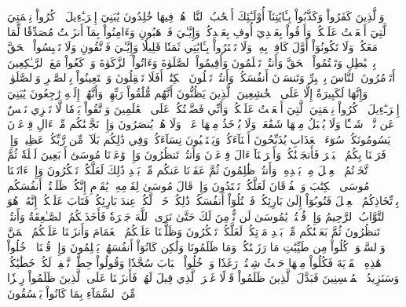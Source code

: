 وَٱلَّذِينَ كَفَرُواْ وَكَذَّبُواْ بِـَٔايَٰتِنَآ أُوْلَـٰٓئِكَ أَصۡحَٰبُ ٱلنَّارِۖ هُمۡ فِيهَا خَٰلِدُونَ
يَٰبَنِيٓ إِسۡرَـٰٓءِيلَ ٱذۡكُرُواْ نِعۡمَتِيَ ٱلَّتِيٓ أَنۡعَمۡتُ عَلَيۡكُمۡ وَأَوۡفُواْ بِعَهۡدِيٓ أُوفِ بِعَهۡدِكُمۡ وَإِيَّـٰيَ فَٱرۡهَبُونِ
وَءَامِنُواْ بِمَآ أَنزَلۡتُ مُصَدِّقٗا لِّمَا مَعَكُمۡ وَلَا تَكُونُوٓاْ أَوَّلَ كَافِرِۭ بِهِۦۖ وَلَا تَشۡتَرُواْ بِـَٔايَٰتِي ثَمَنٗا قَلِيلٗا وَإِيَّـٰيَ فَٱتَّقُونِ
وَلَا تَلۡبِسُواْ ٱلۡحَقَّ بِٱلۡبَٰطِلِ وَتَكۡتُمُواْ ٱلۡحَقَّ وَأَنتُمۡ تَعۡلَمُونَ
وَأَقِيمُواْ ٱلصَّلَوٰةَ وَءَاتُواْ ٱلزَّكَوٰةَ وَٱرۡكَعُواْ مَعَ ٱلرَّـٰكِعِينَ
۞أَتَأۡمُرُونَ ٱلنَّاسَ بِٱلۡبِرِّ وَتَنسَوۡنَ أَنفُسَكُمۡ وَأَنتُمۡ تَتۡلُونَ ٱلۡكِتَٰبَۚ أَفَلَا تَعۡقِلُونَ
وَٱسۡتَعِينُواْ بِٱلصَّبۡرِ وَٱلصَّلَوٰةِۚ وَإِنَّهَا لَكَبِيرَةٌ إِلَّا عَلَى ٱلۡخَٰشِعِينَ
ٱلَّذِينَ يَظُنُّونَ أَنَّهُم مُّلَٰقُواْ رَبِّهِمۡ وَأَنَّهُمۡ إِلَيۡهِ رَٰجِعُونَ
يَٰبَنِيٓ إِسۡرَـٰٓءِيلَ ٱذۡكُرُواْ نِعۡمَتِيَ ٱلَّتِيٓ أَنۡعَمۡتُ عَلَيۡكُمۡ وَأَنِّي فَضَّلۡتُكُمۡ عَلَى ٱلۡعَٰلَمِينَ
وَٱتَّقُواْ يَوۡمٗا لَّا تَجۡزِي نَفۡسٌ عَن نَّفۡسٖ شَيۡـٔٗا وَلَا يُقۡبَلُ مِنۡهَا شَفَٰعَةٞ وَلَا يُؤۡخَذُ مِنۡهَا عَدۡلٞ وَلَا هُمۡ يُنصَرُونَ
وَإِذۡ نَجَّيۡنَٰكُم مِّنۡ ءَالِ فِرۡعَوۡنَ يَسُومُونَكُمۡ سُوٓءَ ٱلۡعَذَابِ يُذَبِّحُونَ أَبۡنَآءَكُمۡ وَيَسۡتَحۡيُونَ نِسَآءَكُمۡۚ وَفِي ذَٰلِكُم بَلَآءٞ مِّن رَّبِّكُمۡ عَظِيمٞ
وَإِذۡ فَرَقۡنَا بِكُمُ ٱلۡبَحۡرَ فَأَنجَيۡنَٰكُمۡ وَأَغۡرَقۡنَآ ءَالَ فِرۡعَوۡنَ وَأَنتُمۡ تَنظُرُونَ
وَإِذۡ وَٰعَدۡنَا مُوسَىٰٓ أَرۡبَعِينَ لَيۡلَةٗ ثُمَّ ٱتَّخَذۡتُمُ ٱلۡعِجۡلَ مِنۢ بَعۡدِهِۦ وَأَنتُمۡ ظَٰلِمُونَ
ثُمَّ عَفَوۡنَا عَنكُم مِّنۢ بَعۡدِ ذَٰلِكَ لَعَلَّكُمۡ تَشۡكُرُونَ
وَإِذۡ ءَاتَيۡنَا مُوسَى ٱلۡكِتَٰبَ وَٱلۡفُرۡقَانَ لَعَلَّكُمۡ تَهۡتَدُونَ
وَإِذۡ قَالَ مُوسَىٰ لِقَوۡمِهِۦ يَٰقَوۡمِ إِنَّكُمۡ ظَلَمۡتُمۡ أَنفُسَكُم بِٱتِّخَاذِكُمُ ٱلۡعِجۡلَ فَتُوبُوٓاْ إِلَىٰ بَارِئِكُمۡ فَٱقۡتُلُوٓاْ أَنفُسَكُمۡ ذَٰلِكُمۡ خَيۡرٞ لَّكُمۡ عِندَ بَارِئِكُمۡ فَتَابَ عَلَيۡكُمۡۚ إِنَّهُۥ هُوَ ٱلتَّوَّابُ ٱلرَّحِيمُ
وَإِذۡ قُلۡتُمۡ يَٰمُوسَىٰ لَن نُّؤۡمِنَ لَكَ حَتَّىٰ نَرَى ٱللَّهَ جَهۡرَةٗ فَأَخَذَتۡكُمُ ٱلصَّـٰعِقَةُ وَأَنتُمۡ تَنظُرُونَ
ثُمَّ بَعَثۡنَٰكُم مِّنۢ بَعۡدِ مَوۡتِكُمۡ لَعَلَّكُمۡ تَشۡكُرُونَ
وَظَلَّلۡنَا عَلَيۡكُمُ ٱلۡغَمَامَ وَأَنزَلۡنَا عَلَيۡكُمُ ٱلۡمَنَّ وَٱلسَّلۡوَىٰۖ كُلُواْ مِن طَيِّبَٰتِ مَا رَزَقۡنَٰكُمۡۚ وَمَا ظَلَمُونَا وَلَٰكِن كَانُوٓاْ أَنفُسَهُمۡ يَظۡلِمُونَ
وَإِذۡ قُلۡنَا ٱدۡخُلُواْ هَٰذِهِ ٱلۡقَرۡيَةَ فَكُلُواْ مِنۡهَا حَيۡثُ شِئۡتُمۡ رَغَدٗا وَٱدۡخُلُواْ ٱلۡبَابَ سُجَّدٗا وَقُولُواْ حِطَّةٞ نَّغۡفِرۡ لَكُمۡ خَطَٰيَٰكُمۡۚ وَسَنَزِيدُ ٱلۡمُحۡسِنِينَ
فَبَدَّلَ ٱلَّذِينَ ظَلَمُواْ قَوۡلًا غَيۡرَ ٱلَّذِي قِيلَ لَهُمۡ فَأَنزَلۡنَا عَلَى ٱلَّذِينَ ظَلَمُواْ رِجۡزٗا مِّنَ ٱلسَّمَآءِ بِمَا كَانُواْ يَفۡسُقُونَ
